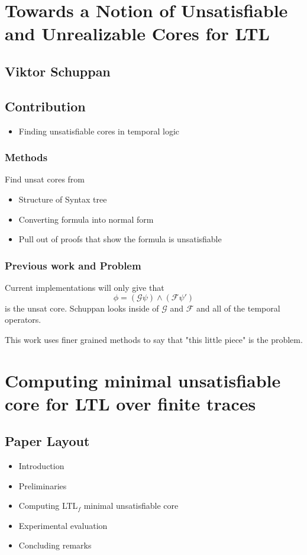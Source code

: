 \documentclass{article}
\begin{document}
\section*{Towards a Notion of Unsatisfiable and Unrealizable Cores for LTL}
\subsection*{Viktor Schuppan}
\subsection*{Contribution}
\begin{itemize}
    \item Finding unsatisfiable cores in temporal logic
\end{itemize}

\subsubsection*{Methods}
Find unsat cores from
\begin{itemize}
    \item Structure of Syntax tree
    \item Converting formula into normal form
    \item Pull out of proofs that show the formula is unsatisfiable
\end{itemize}

\subsubsection*{Previous work and Problem}
Current implementations will only give that \[\phi = (\mathcal{G} \psi) \wedge (\mathcal{F} \psi')\] is the unsat core. Schuppan looks inside of $\mathcal{G} $ and $\mathcal{F}$ and all of the temporal operators.

This work uses finer grained methods to say that "this little piece" is the problem.



\section*{Computing minimal unsatisfiable core for LTL over finite traces \cite{niu_computing_2024}}
\subsection*{Paper Layout}
\begin{itemize}
    \item Introduction
    \item Preliminaries
    \item Computing {LTL$_f$} minimal unsatisfiable core
    \item Experimental evaluation
    \item Concluding remarks
\end{itemize}
\end{document}
